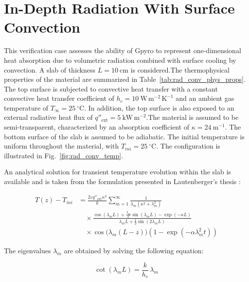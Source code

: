 \documentclass[12pt]{article}
\begin{document}
\fi

\section{In-Depth Radiation With Surface Convection}

This verification case assesses the ability of Gpyro to represent one-dimensional heat absorption due to volumetric radiation combined with surface cooling by convection. A slab of thickness $L = 10~\mathrm{cm}$ is considered.The thermophysical properties of the material are summarized in Table~\ref{tab:rad_conv_phys_props}. The top surface is subjected to convective heat transfer with a constant convective heat transfer coefficient of $h_c = 10~\mathrm{W\,m^{-2}\,K^{-1}}$ and an ambient gas temperature of $T_\infty = 25~^\circ\mathrm{C}$. In addition, the top surface is also exposed to an external radiative heat flux of $q''_\mathrm{ext} = 5~\mathrm{kW\,m^{-2}}$.The material is assumed to be semi-transparent, characterized by an absorption coefficient of $\kappa = 24~\mathrm{m^{-1}}$. The bottom surface of the slab is assumed to be adiabatic. The initial temperature is uniform throughout the material, with $T_{ini} = 25~^\circ\mathrm{C}$. The configuration is illustrated in Fig.~\ref{fig:rad_conv_temp}.

An analytical solution for transient temperature evolution within the slab is available and is taken from the formulation presented in Lautenberger’s thesis \cite{lautenberger2007}:

\begin{equation}
\label{eq:temp_depth_lautenberger}
\begin{aligned}
T(z) - T_{ini} &= \frac{2 \varepsilon q''_\mathrm{ext} \kappa^2}{k}
\sum_{m=1}^{\infty} \frac{1}{\lambda_m (\kappa^2 + \lambda_m^2)} \\
&\quad \times
\frac{\cos(\lambda_m L) + \tfrac{\lambda_m}{\kappa} \sin(\lambda_m L) - \exp(-\kappa L)}
{\lambda_m L + \tfrac{1}{2} \sin(2 \lambda_m L)} \\
&\quad \times
\cos\!\bigl(\lambda_m (L - z)\bigr)
\left(1 - \exp(-\alpha \lambda_m^2 t)\right)
\end{aligned}
\end{equation}

The eigenvalues $\lambda_m$ are obtained by solving the following equation:

\begin{equation}
\label{eq:lambda_condition}
\cot(\lambda_m L) = \frac{k}{h_c}\,\lambda_m
\end{equation}
\end{document}
